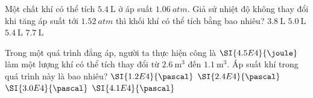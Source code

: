\begin{ex}
Một chất khí có thể tích $\SI{5.4}{\liter}$ ở áp suất $\SI{1.06}{atm}$. Giả sử nhiệt độ không thay đổi khi tăng áp suất tới $\SI{1.52}{atm}$ thì khối khí có thể tích bằng bao nhiêu?	
	\choice
	{\True $\SI{3.8}{\liter}$}
{$\SI{5.0}{\liter}$}
	{$\SI{5.4}{\liter}$}
	{$\SI{7.7}{\liter}$}
\end{ex}
\begin{ex}
Trong một quá trình đẳng áp, người ta thực hiện công là $\SI{4.5E4}{\joule}$ làm một lượng khí có thể tích thay đổi từ $\SI{2.6}{\meter^3}$ đến $\SI{1.1}{\meter^3}$. Áp suất khí trong quá trình này là bao nhiêu?	
	\choice
	{$\SI{1.2E4}{\pascal}$}
	{$\SI{2.4E4}{\pascal}$}
	{\True $\SI{3.0E4}{\pascal}$}
	{$\SI{4.1E4}{\pascal}$}
\end{ex}


